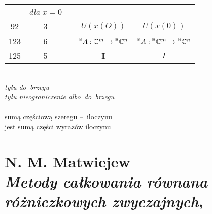 \documentclass[a4paper,11pt]{article}
\numberwithin{equation}{section}
\begin{document}
\begin{center}
\begin{tabular}{|c|c|c|c|c|}
           & \textit{dla} $x = 0$ \\
    92  &  3 & & $U( x( O ) )$ & $U( x( 0 ) )$ \\[0.3em]
    123 &  6 & & $^{ \mathbb{R} }A : \mathbb{C}^{ m } \to { }^{ \mathbb{R} } \mathbb{C}^{ n }$
           & ${ }^{ \mathbb{R} }A : { }^{ \mathbb{R} } \mathbb{C}^{ m }
             \to { }^{ \mathbb{R} } \mathbb{C}^{ n }$ \\
    125 &  5 & & $\mathbf{I}$ & $I$ \\
    \hline
  \end{tabular}

\end{center}

\VerSpaceSix


\noindent
{} \\
\Jest \textit{tyłu do~brzegu} \\
\PowinnoByc \textit{tyłu nieograniczenie albo~do~brzegu} \\
 \\
\Jest sumą częściową szeregu --~iloczynu \\
\PowinnoByc jest sumą części wyrazów iloczynu \\













\section{ %
  N. M. Matwiejew \\
  \textit{Metody całkowania równana różniczkowych zwyczajnych},
  \cite{MatwiejewMetodyCalkowaniaRownanRozniczkowychZwyczajnych1982}}

\vspace{0em}


\end{document}
